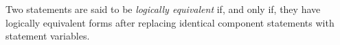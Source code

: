 \guard



\begin{defn}
\label{defn:logicallyEquivalentStatement}
  Two statements are said to be \emph{logically equivalent} if, and only if, they have logically equivalent forms after replacing identical component statements with statement variables.
\end{defn}
